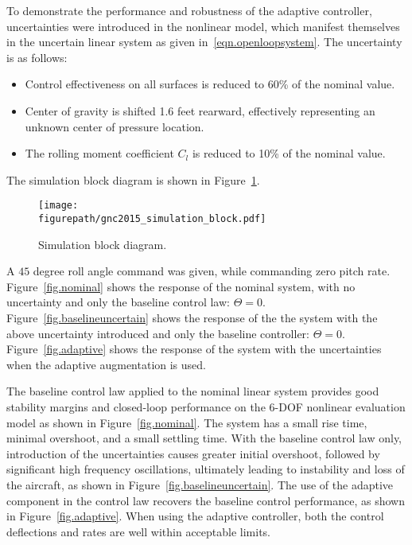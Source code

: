 \documentclass[]{../sty/aiaa-tc}
\newcommand{\figurepath}{../fig}
\begin{document}
  To demonstrate the performance and robustness of the adaptive controller, uncertainties were introduced in the nonlinear model, which manifest themselves in the uncertain linear system as given in\ \eqref{eqn.openloopsystem}.
  The uncertainty is as follows:
  \begin{itemize}
    \item{Control effectiveness on all surfaces is reduced to 60\% of the nominal value.}
    \item{Center of gravity is shifted 1.6 feet rearward, effectively representing an unknown center of pressure location.}
    \item{The rolling moment coefficient $C_{l}$ is reduced to 10\% of the nominal value.}
  \end{itemize}
  The simulation block diagram is shown in Figure~\ref{fig.block}.

  \begin{figure}[H]
    \begin{center}
      \texttt{[image: \\figurepath/gnc2015\_simulation\_block.pdf]}
      \vspace{-0.1in}
      \caption{Simulation block diagram.\label{fig.block}}
    \end{center}
  \end{figure}

  A $45$ degree roll angle command was given, while commanding zero pitch rate.
  Figure~\ref{fig.nominal} shows the response of the nominal system, with no uncertainty and only the baseline control law: $\Theta=0$.
  Figure~\ref{fig.baselineuncertain} shows the response of the the system with the above uncertainty introduced and only the baseline controller: $\Theta=0$.
  Figure~\ref{fig.adaptive} shows the response of the system with the uncertainties when the adaptive augmentation is used.

  The baseline control law applied to the nominal linear system provides good stability margins and closed-loop performance on the 6-DOF nonlinear evaluation model as shown in Figure~\ref{fig.nominal}.
  The system has a small rise time, minimal overshoot, and a small settling time.
  With the baseline control law only, introduction of the uncertainties causes greater initial overshoot, followed by significant high frequency oscillations, ultimately leading to instability and loss of the aircraft, as shown in Figure~\ref{fig.baselineuncertain}.
  The use of the adaptive component in the control law recovers the baseline control performance, as shown in Figure~\ref{fig.adaptive}.
  When using the adaptive controller, both the control deflections and rates are well within acceptable limits.
\end{document}
